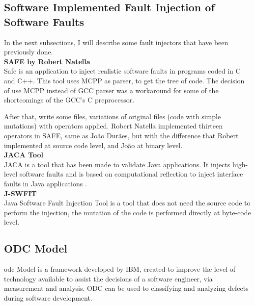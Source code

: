 \clearpage
\subsection{Software Implemented Fault Injection of Software Faults}
In the next subsections, I will describe some fault injectors that have been previously done.\\

\textbf{SAFE by Robert Natella}\\

Safe is an application to inject realistic software faults in programs coded in C and C++.
This tool uses MCPP as parser, to get the tree of code. The decision of use MCPP instead of GCC parser was a workaround for some of the shortcomings of the GCC's C preprocessor.

After that, write some files, variations of original files (code with simple mutations) with operators applied.
Robert Natella implemented thirteen operators in SAFE, same as João Durães\cite{duraes2006emulation}, but with the difference that Robert implemented at source code level, and João at binary level.\\


\textbf{JACA Tool}\\

JACA\cite{regina2003jaca} is a tool that has been made to validate Java applications. It injects high-level software faults and is based on computational reflection to inject interface faults in Java applications
\cite{martins2002jaca}. \\

\textbf{J-SWFIT} \\

Java Software Fault Injection Tool\cite{sanches2011j} is a tool that does not need the source code to perform the injection, the mutation of the code is performed directly at byte-code level.

\clearpage
\subsection{ODC Model}
\acl{odc}\cite{bridge1998orthogonal} Model is a framework developed by IBM\cite{chillarege2004orthogonal}, created to improve the level of technology available to assist the decisions of a software engineer, via measurement and analysis.
ODC can be used to classifying and analyzing defects during software development.

